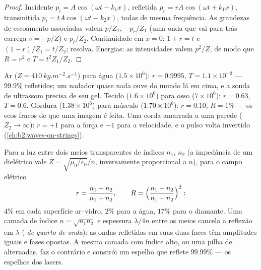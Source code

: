 \begin{proof}
Incidente $p_i = A\cos(\omega t - k_1x)$, refletida $p_r = rA\cos(\omega t + k_1x)$,
transmitida $p_t = tA\cos(\omega t - k_2x)$, todas de mesma frequência. As grandezas
de escoamento associadas valem $p/Z_1$, $-p_r/Z_1$ (uma onda que vai para trás carrega
$v = -p/Z$) e $p_t/Z_2$. Continuidade em $x = 0$: $1 + r = t$ e $(1 - r)/Z_1
= t/Z_2$; resolva. Energias: as intensidades valem $p^2/Z$, de modo que $R = r^2$ e
$T = t^2Z_1/Z_2$.
\end{proof}

\begin{example}\label{ex:b2:wave-interfaces:sound}
Ar ($Z = \qty{410}{kg.m^{-2}.s^{-1}}$) para água ($1.5 \times 10^6$): $r = 0.9995$,
$T = 1.1 \times 10^{-3}$ --- $99.9\%$ refletidos; um nadador quase nada ouve
do mundo lá em cima, e a sonda de ultrassom precisa de seu gel. Tecido
($1.6 \times 10^6$) para osso ($7 \times 10^6$): $r = 0.63$, $T = 0.6$. Gordura ($1.38 \times
10^6$) para músculo ($1.70 \times 10^6$): $r = 0.10$, $R = 1\%$ --- os ecos fracos de que uma
imagem é feita. Uma corda amarrada a uma parede ($Z_2 \to \infty$): $r = +1$ para a
força e $-1$ para a velocidade, e o pulso volta invertido
(\cref{ch:b2:waves-on-strings}).
\end{example}

\begin{proposition}\label{prop:b2:wave-interfaces:optics}
Para a luz entre dois meios transparentes de índices $n_1$, $n_2$ (a
impedância de um dielétrico vale $Z = \sqrt{\mu_0/\varepsilon_0}/n$, inversamente
proporcional a $n$), para o campo elétrico
\[
r = \frac{n_1 - n_2}{n_1 + n_2} , \qquad R = \Bigl(\frac{n_1 - n_2}{n_1 + n_2}\Bigr)^2 :
\]
$4\%$ em cada superfície ar--vidro, $2\%$ para a água, $17\%$ para o diamante. Uma
camada de índice $n = \sqrt{n_1n_2}$ e espessura $\lambda/4n$ entre os meios
cancela a reflexão em $\lambda$ (\emph{ de quarto
de onda}): as ondas refletidas em suas duas faces têm amplitudes iguais
e fases opostas. A mesma camada com índice alto, ou uma pilha de
 alternadas, faz o contrário e constrói um
espelho que reflete $99.99\%$ --- os espelhos dos lasers.
\end{proposition}

